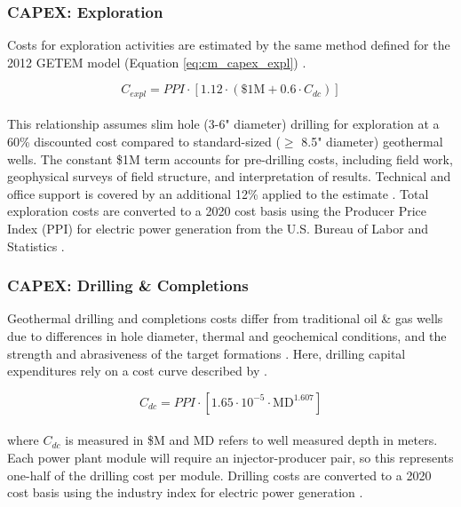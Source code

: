 \subsubsection{CAPEX: Exploration} \label{ch4:cm_capex_expl}
Costs for exploration activities are estimated by the same method defined for the 2012 GETEM model (Equation \ref{eq:cm_capex_expl}) \citep{eere_getem_2012}. 

\begin{equation}
\label{eq:cm_capex_expl}
    C_{expl} = PPI \cdot \left[ 1.12 \cdot (\$1\text{M} + 0.6\cdot C_{dc}) \right]
\end{equation}
\\
This relationship assumes slim hole (3-6" diameter) drilling for exploration at a 60\% discounted cost compared to standard-sized ($\geq$ 8.5" diameter) geothermal wells. The constant \$1M term accounts for pre-drilling costs, including field work, geophysical surveys of field structure, and interpretation of results. Technical and office support is covered by an additional 12\% applied to the estimate \citep{eere_getem_2012}. Total exploration costs are converted to a 2020 cost basis using the Producer Price Index (PPI) for electric power generation from the U.S. Bureau of Labor and Statistics \citep{us_bls_ppi_2021}.

\subsubsection{CAPEX: Drilling \& Completions} 
\label{ch4:cm_capex_dc}

Geothermal drilling and completions costs differ from traditional oil \& gas wells due to differences in hole diameter, thermal and geochemical conditions, and the strength and abrasiveness of the target formations \citep{lowry_geovision_2017}. Here, drilling capital expenditures rely on a cost curve described by \citet[Equation 4,\ ][]{beckers_introducing_2013}.

\begin{equation}
\label{eq:cm_cdc}
    C_{dc} = PPI \cdot \left[ 1.65 \cdot 10^{-5} \cdot \text{MD}^{1.607} \right]
\end{equation}
\\
where $C_{dc}$ is measured in \$M and MD refers to well measured depth in meters. Each power plant module will require an injector-producer pair, so this represents one-half of the drilling cost per module. Drilling costs are converted to a 2020 cost basis using the industry index for electric power generation \citep{us_bls_ppi_2021}. 

